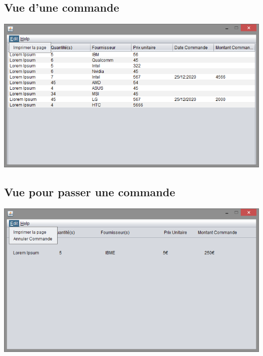 \subsection{Vue d'une commande}
\begin{center}
	\includegraphics[width=14cm]{Analyse/CommanderView.png}
\end{center}

\subsection{Vue pour passer une commande}
\begin{center}
	\includegraphics[width=14cm]{Analyse/CommandeView.png}
\end{center}


